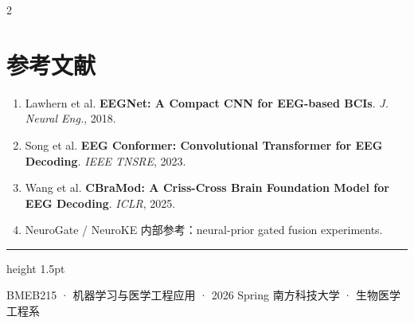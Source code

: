 \documentclass[12pt, a0paper]{article}
\renewcommand{\footnotesize}{\fontsize{14}{18}\selectfont}
\begin{document}
\begin{multicols}{2}
\vspace{0.5em}
\section*{参考文献}

{\footnotesize
\begin{enumerate}[leftmargin=1.5em, itemsep=0.1em]
    \item Lawhern et al. \textbf{EEGNet: A Compact CNN for EEG-based BCIs}. \textit{J. Neural Eng.}, 2018.
    \item Song et al. \textbf{EEG Conformer: Convolutional Transformer for EEG Decoding}. \textit{IEEE TNSRE}, 2023.
    \item Wang et al. \textbf{CBraMod: A Criss-Cross Brain Foundation Model for EEG Decoding}. \textit{ICLR}, 2025.
    \item NeuroGate / NeuroKE 内部参考：neural-prior gated fusion experiments.
\end{enumerate}
}

\end{multicols}

\vspace{2mm}
{\color{myblue}\hrule height 1.5pt}
\vspace{2mm}
\begin{center}
{\footnotesize\color{mygray}
    BMEB215 · 机器学习与医学工程应用 · 2026 Spring \hspace{3em}
    南方科技大学 · 生物医学工程系
}
\end{center}
\end{document}
